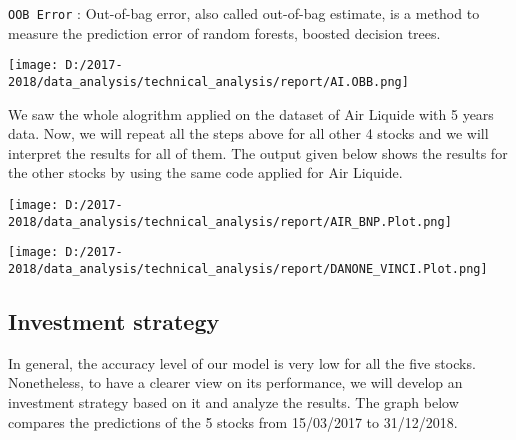 \documentclass[
  11pt,
]{article}
\newenvironment{Shaded}{\begin{snugshade}}{\end{snugshade}}
\newcommand{\CommentTok}[1]{\textcolor[rgb]{0.56,0.35,0.01}{\textit{#1}}}
\newcommand{\DataTypeTok}[1]{\textcolor[rgb]{0.13,0.29,0.53}{#1}}
\newcommand{\DecValTok}[1]{\textcolor[rgb]{0.00,0.00,0.81}{#1}}
\newcommand{\FloatTok}[1]{\textcolor[rgb]{0.00,0.00,0.81}{#1}}
\newcommand{\KeywordTok}[1]{\textcolor[rgb]{0.13,0.29,0.53}{\textbf{#1}}}
\newcommand{\NormalTok}[1]{#1}
\newcommand{\OperatorTok}[1]{\textcolor[rgb]{0.81,0.36,0.00}{\textbf{#1}}}
\newcommand{\StringTok}[1]{\textcolor[rgb]{0.31,0.60,0.02}{#1}}
\let\origfigure\figure
\let\endorigfigure\endfigure
\renewenvironment{figure}[1][2] {
    \expandafter\origfigure\expandafter[H]
} {
    \endorigfigure
}
\begin{document}
\begin{Shaded}
\end{Shaded}

\texttt{OOB\ Error} : Out-of-bag error, also called out-of-bag estimate,
is a method to measure the prediction error of random forests, boosted
decision trees.

\begin{figure}
\centering
\texttt{[image: D:/2017-2018/data\_analysis/technical\_analysis/report/AI.OBB.png]}
\caption{OOB Error of Air Liquide}
\end{figure}

We saw the whole alogrithm applied on the dataset of Air Liquide with 5
years data. Now, we will repeat all the steps above for all other 4
stocks and we will interpret the results for all of them. The output
given below shows the results for the other stocks by using the same
code applied for Air Liquide.

\begin{figure}
\centering
\texttt{[image: D:/2017-2018/data\_analysis/technical\_analysis/report/AIR\_BNP.Plot.png]}
\caption{RANDOM FOREST AND OOB ERRORS FOR AIRBUS AND BNP PARIBAS}
\end{figure}

\begin{figure}
\centering
\texttt{[image: D:/2017-2018/data\_analysis/technical\_analysis/report/DANONE\_VINCI.Plot.png]}
\caption{RANDOM FOREST AND OOB ERRORS FOR DANONE AND VINCI}
\end{figure}

\hypertarget{investment-strategy}{%
\subsection{Investment strategy}\label{investment-strategy}}

In general, the accuracy level of our model is very low for all the five
stocks. Nonetheless, to have a clearer view on its performance, we will
develop an investment strategy based on it and analyze the results. The
graph below compares the predictions of the 5 stocks from 15/03/2017 to
31/12/2018.
\end{document}
